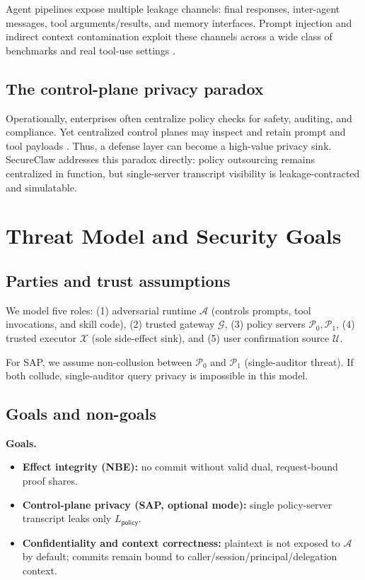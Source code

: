Agent pipelines expose multiple leakage channels: final responses, inter-agent messages, tool arguments/results, and memory interfaces.
Prompt injection and indirect context contamination exploit these channels across a wide class of benchmarks and real tool-use settings \citep{greshake2023indirect,injecagent2024,agentdojo2024,agentleak2026}.

\subsection{The control-plane privacy paradox}

Operationally, enterprises often centralize policy checks for safety, auditing, and compliance.
Yet centralized control planes may inspect and retain prompt and tool payloads \citep{azureapimllmlogs2026,cloudflarefirewallai2026,cloudflareaidlp2026,dynatracemasklogs2026}.
Thus, a defense layer can become a high-value privacy sink.
SecureClaw addresses this paradox directly: policy outsourcing remains centralized in function, but single-server transcript visibility is leakage-contracted and simulatable.

\section{Threat Model and Security Goals}
\label{sec:threat}

\subsection{Parties and trust assumptions}

We model five roles:
(1) adversarial runtime $\mathcal{A}$ (controls prompts, tool invocations, and skill code),
(2) trusted gateway $\mathcal{G}$,
(3) policy servers $\mathcal{P}_0,\mathcal{P}_1$,
(4) trusted executor $\mathcal{X}$ (sole side-effect sink), and
(5) user confirmation source $\mathcal{U}$.

For SAP, we assume non-collusion between $\mathcal{P}_0$ and $\mathcal{P}_1$ (single-auditor threat).
If both collude, single-auditor query privacy is impossible in this model.

\subsection{Goals and non-goals}

\textbf{Goals.}
\begin{itemize}
  \item \textbf{Effect integrity (NBE):} no commit without valid dual, request-bound proof shares.
  \item \textbf{Control-plane privacy (SAP, optional mode):} single policy-server transcript leaks only $L_{\mathsf{policy}}$.
  \item \textbf{Confidentiality and context correctness:} plaintext is not exposed to $\mathcal{A}$ by default; commits remain bound to caller/session/principal/delegation context.
\end{itemize}


